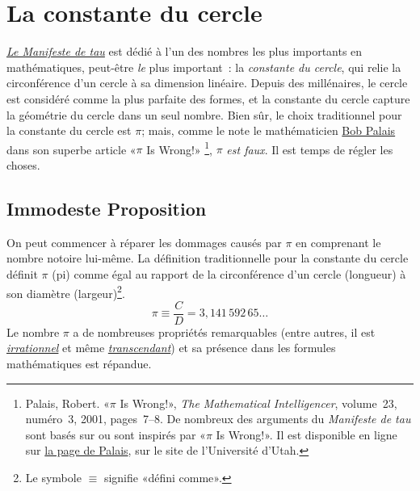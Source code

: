 \section{La constante du cercle} %
\label{sec:the_circle_constant}

\href{https://tauday.com/le_manifeste_de_tau}{\emph{Le Manifeste de tau}} est dédié
à l'un des nombres les plus importants en mathématiques, peut-être \emph{le}
plus important~: la \emph{constante du cercle}, qui relie la circonférence d'un
cercle à sa dimension linéaire. Depuis des millénaires, le cercle est considéré
comme la plus parfaite des formes, et la constante du cercle capture la
géométrie du cercle dans un seul nombre. Bien sûr, le choix traditionnel pour la
constante du cercle est $\pi$\ns; mais, comme le note le mathématicien
\href{https://translate.google.com/translate?sl=en&tl=fr&u=https://www.math.utah.edu/~palais/}{Bob
Palais} dans son superbe article
«\ns $\pi$ Is Wrong!\ns » \footnote{Palais, Robert. «\ns $\pi$ Is Wrong!\ns », \emph{The
Mathematical Intelligencer}, volume~23, numéro~3, 2001, pages~7--8. De nombreux
des arguments du \emph{Manifeste de tau} sont basés sur ou sont inspirés par
«\ns $\pi$ Is Wrong!\ns ». Il est disponible en ligne sur
\href{https://translate.google.com/translate?hl=&sl=en&tl=fr&u=https://www.math.utah.edu/~palais/pi.html}{la
page de Palais}, sur le site de l'Université d'Utah.},
$\pi$ \emph{est faux}. Il est temps de régler les choses.

  \subsection{Immodeste Proposition} %
  \label{sec:an_immodest_proposal}

On peut commencer à réparer les dommages causés par $\pi$ en comprenant le nombre
notoire lui-même. La définition traditionnelle pour la constante du cercle
définit $\pi$ (pi) comme égal au rapport de la circonférence d'un cercle
(longueur) à son diamètre (largeur)\ns\footnote{Le symbole $\equiv$ signifie
«\ns défini comme\ns ».}.
\begin{equation}
\label{eq:pi}
\pi \equiv \frac{C}{D} = 3{,}141\,592\,65\ldots
\end{equation}
Le nombre $\pi$ a de nombreuses propriétés remarquables (entre autres, il est
\href{https://fr.wikipedia.org/wiki/Nombre_irrationnel}{\emph{irrationnel}} et
même \href{https://fr.wikipedia.org/wiki/Nombre_transcendant}{\emph{transcendant}}) et
sa présence dans les formules mathématiques est répandue.

